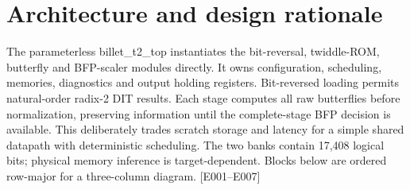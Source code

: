 \documentclass[11pt,a4paper]{article}
\begin{document}
\section{Architecture and design rationale}

The parameterless billet\_\allowbreak{}t2\_\allowbreak{}top instantiates the bit-reversal,\allowbreak{} twiddle-ROM,\allowbreak{} butterfly and BFP-scaler modules directly. It owns configuration,\allowbreak{} scheduling,\allowbreak{} memories,\allowbreak{} diagnostics and output holding registers. Bit-reversed loading permits natural-order radix-2 DIT results. Each stage computes all raw butterflies before normalization,\allowbreak{} preserving information until the complete-stage BFP decision is available. This deliberately trades scratch storage and latency for a simple shared datapath with deterministic scheduling. The two banks contain 17,\allowbreak{}408 logical bits; physical memory inference is target-dependent. Blocks below are ordered row-major for a three-column diagram. [\allowbreak{}E001–E007]\allowbreak{}
\end{document}

